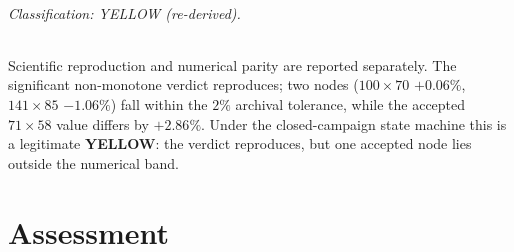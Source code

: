 \documentclass[11pt]{article}
\begin{document}
\paragraph{Classification: YELLOW (re-derived).} Scientific reproduction and numerical parity are
reported separately. The significant non-monotone verdict reproduces; two nodes ($100{\times}70$
$+0.06\%$, $141{\times}85$ $-1.06\%$) fall within the $2\%$ archival tolerance, while the accepted
$71{\times}58$ value differs by $+2.86\%$. Under the closed-campaign state machine this is a legitimate
\textbf{YELLOW}: the verdict reproduces, but one accepted node lies outside the numerical band.

\part{Assessment}
\end{document}
